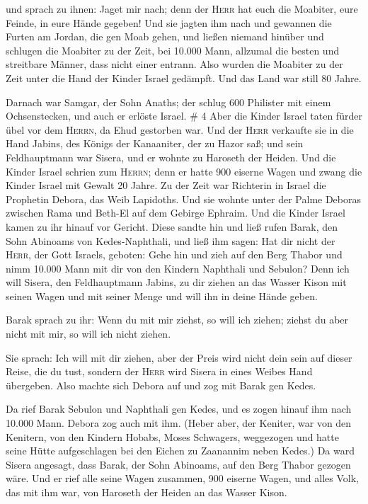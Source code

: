  und sprach zu ihnen: Jaget mir nach; denn der
\textsc{Herr} hat euch die Moabiter, eure Feinde, in eure Hände gegeben!
Und sie jagten ihm nach und gewannen die Furten am Jordan, die gen Moab
gehen, und ließen niemand hinüber  und schlugen die
Moabiter zu der Zeit, bei 10.000 Mann, allzumal die besten und
streitbare Männer, dass nicht einer entrann.  Also wurden
die Moabiter zu der Zeit unter die Hand der Kinder Israel gedämpft. Und
das Land war still 80 Jahre.

 Darnach war Samgar, der Sohn Anaths; der schlug 600
Philister mit einem Ochsenstecken, und auch er erlöste Israel. \# 4
 Aber die Kinder Israel taten fürder übel vor dem
\textsc{Herrn}, da Ehud gestorben war.  Und der
\textsc{Herr} verkaufte sie in die Hand Jabins, des Königs der
Kanaaniter, der zu Hazor saß; und sein Feldhauptmann war Sisera, und er
wohnte zu Haroseth der Heiden.  Und die Kinder Israel
schrien zum \textsc{Herrn}; denn er hatte 900 eiserne Wagen und zwang
die Kinder Israel mit Gewalt 20 Jahre.  Zu der Zeit war
Richterin in Israel die Prophetin Debora, das Weib Lapidoths.
 Und sie wohnte unter der Palme Deboras zwischen Rama und
Beth-El auf dem Gebirge Ephraim. Und die Kinder Israel kamen zu ihr
hinauf vor Gericht.  Diese sandte hin und ließ rufen
Barak, den Sohn Abinoams von Kedes-Naphthali, und ließ ihm sagen: Hat
dir nicht der \textsc{Herr}, der Gott Israels, geboten: Gehe hin und
zieh auf den Berg Thabor und nimm 10.000 Mann mit dir von den Kindern
Naphthali und Sebulon?  Denn ich will Sisera, den
Feldhauptmann Jabins, zu dir ziehen an das Wasser Kison mit seinen Wagen
und mit seiner Menge und will ihn in deine Hände geben.

 Barak sprach zu ihr: Wenn du mit mir ziehst, so will ich
ziehen; ziehst du aber nicht mit mir, so will ich nicht ziehen.

 Sie sprach: Ich will mit dir ziehen, aber der Preis wird
nicht dein sein auf dieser Reise, die du tust, sondern der \textsc{Herr}
wird Sisera in eines Weibes Hand übergeben. Also machte sich Debora auf
und zog mit Barak gen Kedes.

 Da rief Barak Sebulon und Naphthali gen Kedes, und es
zogen hinauf ihm nach 10.000 Mann. Debora zog auch mit ihm.
 (Heber aber, der Keniter, war von den Kenitern, von den
Kindern Hobabs, Moses Schwagers, weggezogen und hatte seine Hütte
aufgeschlagen bei den Eichen zu Zaanannim neben Kedes.) 
Da ward Sisera angesagt, dass Barak, der Sohn Abinoams, auf den Berg
Thabor gezogen wäre.  Und er rief alle seine Wagen
zusammen, 900 eiserne Wagen, und alles Volk, das mit ihm war, von
Haroseth der Heiden an das Wasser Kison.

